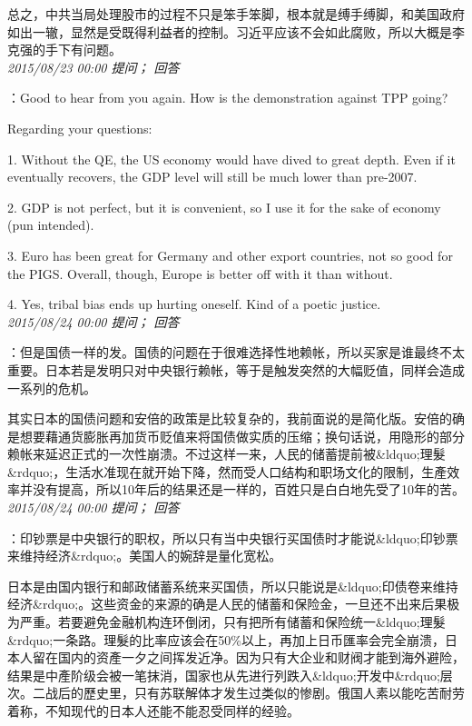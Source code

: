 \documentclass[twocolumn]{ctexart}
\begin{document}
总之，中共当局处理股市的过程不只是笨手笨脚，根本就是缚手缚脚，和美国政府如出一辙，显然是受既得利益者的控制。习近平应该不会如此腐败，所以大概是李克强的手下有问题。\\

\textit{\hfill\noindent\small 2015/08/23 00:00 提问； 回答}

：Good to hear from you again. How is the demonstration against TPP going?

Regarding your questions:

1. Without the QE, the US economy would have dived to great depth. Even if it eventually recovers, the GDP level will still be much lower than pre-2007.

2. GDP is not perfect, but it is convenient, so I use it for the sake of economy (pun intended).

3. Euro has been great for Germany and other export countries, not so good for the PIGS. Overall, though, Europe is better off with it than without.

4. Yes, tribal bias ends up hurting oneself. Kind of a poetic justice.\\

\textit{\hfill\noindent\small 2015/08/24 00:00 提问； 回答}

：但是国债一样的发。国债的问题在于很难选择性地赖帐，所以买家是谁最终不太重要。日本若是发明只对中央银行赖帐，等于是触发突然的大幅贬值，同样会造成一系列的危机。

其实日本的国债问题和安倍的政策是比较复杂的，我前面说的是简化版。安倍的确是想要藉通货膨胀再加货币贬值来将国债做实质的压缩；换句话说，用隐形的部分赖帐来延迟正式的一次性崩溃。不过这样一来，人民的储蓄提前被\&ldquo;理髮\&rdquo;，生活水准现在就开始下降，然而受人口结构和职场文化的限制，生產效率并没有提高，所以10年后的结果还是一样的，百姓只是白白地先受了10年的苦。\\

\textit{\hfill\noindent\small 2015/08/24 00:00 提问； 回答}

：印钞票是中央银行的职权，所以只有当中央银行买国债时才能说\&ldquo;印钞票来维持经济\&rdquo;。美国人的婉辞是量化宽松。

日本是由国内银行和邮政储蓄系统来买国债，所以只能说是\&ldquo;印债卷来维持经济\&rdquo;。这些资金的来源的确是人民的储蓄和保险金，一旦还不出来后果极为严重。若要避免金融机构连环倒闭，只有把所有储蓄和保险统一\&ldquo;理髮\&rdquo;一条路。理髮的比率应该会在50\%以上，再加上日币匯率会完全崩溃，日本人留在国内的资產一夕之间挥发近净。因为只有大企业和财阀才能到海外避险，结果是中產阶级会被一笔抹消，国家也从先进行列跌入\&ldquo;开发中\&rdquo;层次。二战后的歷史里，只有苏联解体才发生过类似的惨剧。俄国人素以能吃苦耐劳着称，不知现代的日本人还能不能忍受同样的经验。\\
\end{document}

